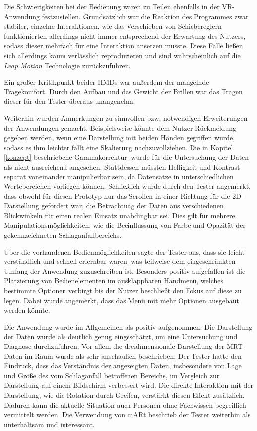 Die Schwierigkeiten bei der Bedienung waren zu Teilen ebenfalls in der VR-Anwendung festzustellen. Grundsätzlich war die Reaktion des Programmes zwar stabiler, einzelne Interaktionen, wie das Verschieben von Schiebereglern funktionierten allerdings nicht immer entsprechend der Erwartung des Nutzers, sodass dieser mehrfach für eine Interaktion ansetzen musste. 
Diese Fälle ließen sich allerdings kaum verlässlich reproduzieren und sind wahrscheinlich auf die \textit{Leap Motion} Technologie zurückzuführen.

Ein großer Kritikpunkt beider HMDs war außerdem der mangelnde Tragekomfort. Durch den Aufbau und das Gewicht der Brillen war das Tragen dieser für den Tester überaus unangenehm. 

Weiterhin wurden Anmerkungen zu sinnvollen bzw. notwendigen Erweiterungen der Anwendungen gemacht.
Beispielsweise könnte dem Nutzer Rückmeldung gegeben werden, wenn eine Darstellung mit beiden Händen gegriffen wurde, sodass es ihm leichter fällt eine Skalierung nachzuvollziehen.
Die in Kapitel \ref{konzept} beschriebene Gammakorrektur, wurde für die Untersuchung der Daten als nicht ausreichend angesehen. Stattdessen müssten Helligkeit und Kontrast separat voneinander manipulierbar sein, da Datensätze in unterschiedlichen Wertebereichen vorliegen können. 
Schließlich wurde durch den Tester angemerkt, dass obwohl für diesen Prototyp nur das Scrollen in einer Richtung für die 2D-Darstellung gefordert war, die Betrachtung der Daten aus verschiedenen Blickwinkeln für einen realen Einsatz unabdingbar sei. Dies gilt für mehrere Manipulationsmöglichkeiten, wie die Beeinflussung von Farbe und Opazität der gekennzeichneten Schlaganfallbereichs.

Über die vorhandenen Bedienmöglichkeiten sagte der Tester aus, dass sie leicht verständlich und schnell erlernbar waren, was teilweise dem eingeschränkten Umfang der Anwendung zuzuschreiben ist.
Besonders positiv aufgefallen ist die Platzierung von Bedienelementen im ausklappbaren Handmenü, welches bestimmte Optionen verbirgt bis der Nutzer beschließt den Fokus auf diese zu legen. Dabei wurde angemerkt, dass das Menü mit mehr Optionen ausgebaut werden könnte. 

Die Anwendung wurde im Allgemeinen als positiv aufgenommen. 
Die Darstellung der Daten wurde als deutlich genug eingeschätzt, um eine Untersuchung und Diagnose durchzuführen. 
Vor allem die dreidimensionale Darstellung der MRT-Daten im Raum wurde als sehr anschaulich beschrieben. Der Tester hatte den Eindruck, dass das Verständnis der angezeigten Daten, insbesondere von Lage und Größe des vom Schlaganfall betroffenen Bereichs, im Vergleich zur Darstellung auf einem Bildschirm verbessert wird. Die direkte Interaktion mit der Darstellung, wie die Rotation durch Greifen, verstärkt diesen Effekt zusätzlich. Dadurch kann die aktuelle Situation auch Personen ohne Fachwissen begreiflich vermittelt werden. 
Die Verwendung von mARt beschrieb der Tester weiterhin als unterhaltsam und interessant.

